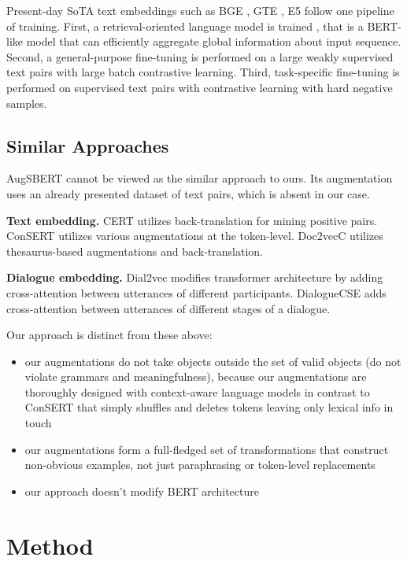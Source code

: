\documentclass{article}
\begin{document}
Present-day SoTA text embeddings such as BGE \cite{xiao2023cpack}, GTE \cite{li2023general}, E5 \cite{wang2022text} follow one pipeline of training. First, a retrieval-oriented language model is trained \cite{xiao2022retromae, gao-callan-2021-condenser}, that is a BERT-like model that can efficiently aggregate global information about input sequence. Second, a general-purpose fine-tuning is performed on a large weakly supervised text pairs with large batch contrastive learning. Third, task-specific fine-tuning is performed on supervised text pairs with 
contrastive learning with hard negative samples.

\subsection{Similar Approaches}

AugSBERT \cite{thakur2021augmented} cannot be viewed as the similar approach to ours. Its augmentation uses an already presented dataset of text pairs, which is absent in our case.

\textbf{Text embedding.} CERT \cite{fang2020cert} utilizes back-translation for mining positive pairs. ConSERT \cite{yan-etal-2021-consert} utilizes various augmentations at the token-level. Doc2vecC \cite{luo2021unsupervised} utilizes thesaurus-based augmentations and back-translation.

\textbf{Dialogue embedding.} Dial2vec \cite{liu2022dial2vec} modifies transformer architecture by adding cross-attention between utterances of different participants. DialogueCSE \cite{liu2021dialoguecse} adds cross-attention between utterances of different stages of a dialogue.

Our approach is distinct from these above:
\begin{itemize}
    \item our augmentations do not take objects outside the set of valid objects (do not violate grammars and meaningfulness), because our augmentations are thoroughly designed with context-aware language models in contrast to ConSERT that simply shuffles and deletes tokens leaving only lexical info in touch
    \item our augmentations form a full-fledged set of transformations that construct non-obvious examples, not just paraphrasing or token-level replacements
    \item our approach doesn't modify BERT architecture
\end{itemize}

\section{Method}
\end{document}
